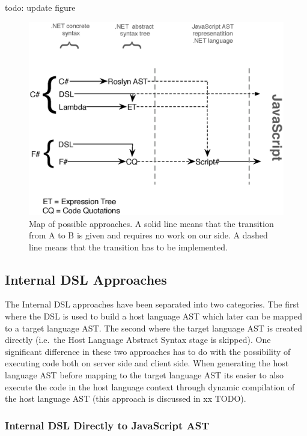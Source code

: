 	todo: update figure
					\begin{figure}[H]
			\begin{center}
				\centerline{\includegraphics[width=14cm]{resources/images/approachComparison.eps}}
			\end{center}
			\caption{Map of possible approaches. A solid line means that the transition from A to B is given and requires no work on our side. A dashed line means that the transition has to be implemented.}
			\label{approachMap}
		\end{figure}

	\subsection{Internal DSL Approaches} %
	\label{ssub:internal_dsl_approaches}

		The Internal DSL approaches have been separated into two categories. The first where the DSL is used to build a host language AST which later can be mapped to a target language AST. The second where the target language AST is created directly (i.e.\ the Host Language Abstract Syntax stage is skipped). One significant difference in these two approaches has to do with the possibility of executing code both on server side and client side. When generating the host language AST before mapping to the target language AST its easier to also execute the code in the host language context through dynamic compilation of the host language AST (this approach is discussed in xx TODO).
	
		\subsubsection{Internal DSL Directly to JavaScript AST} %
		\label{sub:internal_dsl_directly_to_javascript_ast}
		

